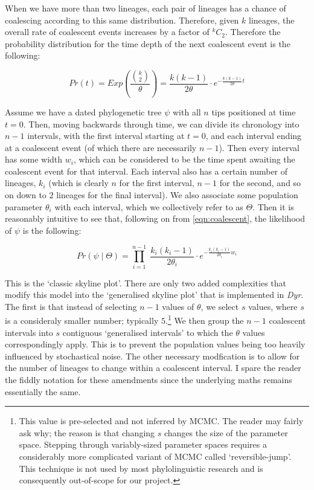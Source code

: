 \documentclass[10pt,journal,compsoc]{IEEEtran}
\begin{document}
When we have more than two lineages, each pair of lineages has a chance of coalescing according to this same distribution. Therefore, given $k$ lineages, the overall rate of coalescent events increases by a factor of $^{k}C_2$. Therefore the probability distribution for the time depth of the next coalescent event is the following:

\begin{equation}\label{eqn:coalescent}
Pr(t) = Exp\left(\frac{\binom{k}{2}}{\theta}\right) = \frac{k(k-1)}{2\theta} \cdot e^{-\frac{k(k-1)}{2\theta} t}
\end{equation}

Assume we have a dated phylogenetic tree $\psi$ with all $n$ tips positioned at time $t=0$. Then, moving backwards through time, we can divide its chronology into $n - 1$ intervals, with the first interval starting at $t=0$, and each interval ending at a coalescent event (of which there are necessarily $n-1$). Then every interval has some width $w_i$, which can be considered to be the time spent awaiting the coalescent event for that interval. Each interval also has a certain number of lineages, $k_i$ (which is clearly $n$ for the first interval, $n - 1$ for the second, and so on down to $2$ lineages for the final interval). We also associate some population parameter $\theta_i$ with each interval, which we collectively refer to as $\Theta$. Then it is reasonably intuitive to see that, following on from \eqref{eqn:coalescent}, the likelihood of $\psi$ is the following:

\begin{equation}\label{eqn:skyline}
Pr(\psi\;|\;\Theta) = \prod_{i = 1}^{n - 1}\; \frac{k_i(k_i-1)}{2\theta_i} \cdot e^{-\frac{k_i(k_i-1)}{2\theta_i} w_i}
\end{equation}

This is the `classic skyline plot'. There are only two added complexities that modify this model into the `generalised skyline plot' that is implemented in \textit{Dyr}. The first is that instead of selecting $n - 1$ values of $\theta$, we select $s$ values, where $s$ is a consideraly smaller number; typically $5$.\footnote{This value is pre-selected and not inferred by MCMC. The reader may fairly ask why; the reason is that changing $s$ changes the size of the parameter space. Stepping through variably-sized parameter spaces requires a considerably more complicated variant of MCMC called `reversible-jump'. This technique is not used by most phylolinguistic research and is consequently out-of-scope for our project.} We then group the $n - 1$ coalescent intervals into $s$ contiguous `generalised intervals' to which the $\theta$ values correspondingly apply. This is to prevent the population values being too heavily influenced by stochastical noise. The other necessary modfication is to allow for the number of lineages to change within a coalescent interval. I spare the reader the fiddly notation for these amendments since the underlying maths remains essentially the same.
\end{document}
